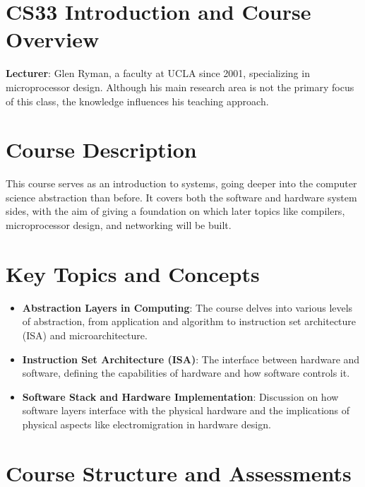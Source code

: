 \documentclass{article}
\begin{document}
\tableofcontents

\newpage

\section{CS33 Introduction and Course Overview}

\textbf{Lecturer}: Glen Ryman, a faculty at UCLA since 2001, specializing in microprocessor design. Although his main research area is not the primary focus of this class, the knowledge influences his teaching approach.

\section{Course Description}

This course serves as an introduction to systems, going deeper into the computer science abstraction than before. It covers both the software and hardware system sides, with the aim of giving a foundation on which later topics like compilers, microprocessor design, and networking will be built.

\section{Key Topics and Concepts}

\begin{itemize}
    \item \textbf{Abstraction Layers in Computing}: The course delves into various levels of abstraction, from application and algorithm to instruction set architecture (ISA) and microarchitecture.
    \item \textbf{Instruction Set Architecture (ISA)}: The interface between hardware and software, defining the capabilities of hardware and how software controls it.
    \item \textbf{Software Stack and Hardware Implementation}: Discussion on how software layers interface with the physical hardware and the implications of physical aspects like electromigration in hardware design.
\end{itemize}

\section{Course Structure and Assessments}
\end{document}
